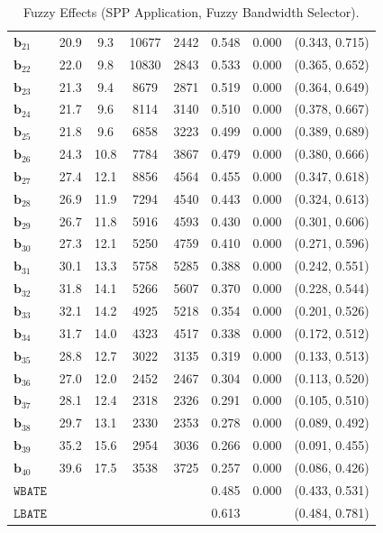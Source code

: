 \documentclass[10pt]{article}
\newcommand{\bb}{\mathbf{b}}
\begin{document}
\begin{table}[p]
\begin{tabular}{lccccccc}
   $\bb_{21}$ & 20.9 & 9.3 & 10677 & 2442 & 0.548 & 0.000 & (0.343, 0.715)\\
   $\bb_{22}$ & 22.0 & 9.8 & 10830 & 2843 & 0.533 & 0.000 & (0.365, 0.652)\\
   $\bb_{23}$ & 21.3 & 9.4 & 8679 & 2871 & 0.519 & 0.000 & (0.364, 0.649)\\
   $\bb_{24}$ & 21.7 & 9.6 & 8114 & 3140 & 0.510 & 0.000 & (0.378, 0.667)\\
   $\bb_{25}$ & 21.8 & 9.6 & 6858 & 3223 & 0.499 & 0.000 & (0.389, 0.689)\\
   $\bb_{26}$ & 24.3 & 10.8 & 7784 & 3867 & 0.479 & 0.000 & (0.380, 0.666)\\
   $\bb_{27}$ & 27.4 & 12.1 & 8856 & 4564 & 0.455 & 0.000 & (0.347, 0.618)\\
   $\bb_{28}$ & 26.9 & 11.9 & 7294 & 4540 & 0.443 & 0.000 & (0.324, 0.613)\\
   $\bb_{29}$ & 26.7 & 11.8 & 5916 & 4593 & 0.430 & 0.000 & (0.301, 0.606)\\
   $\bb_{30}$ & 27.3 & 12.1 & 5250 & 4759 & 0.410 & 0.000 & (0.271, 0.596)\\
   $\bb_{31}$ & 30.1 & 13.3 & 5758 & 5285 & 0.388 & 0.000 & (0.242, 0.551)\\
   $\bb_{32}$ & 31.8 & 14.1 & 5266 & 5607 & 0.370 & 0.000 & (0.228, 0.544)\\
   $\bb_{33}$ & 32.1 & 14.2 & 4925 & 5218 & 0.354 & 0.000 & (0.201, 0.526)\\
   $\bb_{34}$ & 31.7 & 14.0 & 4323 & 4517 & 0.338 & 0.000 & (0.172, 0.512)\\
   $\bb_{35}$ & 28.8 & 12.7 & 3022 & 3135 & 0.319 & 0.000 & (0.133, 0.513)\\
   $\bb_{36}$ & 27.0 & 12.0 & 2452 & 2467 & 0.304 & 0.000 & (0.113, 0.520)\\
   $\bb_{37}$ & 28.1 & 12.4 & 2318 & 2326 & 0.291 & 0.000 & (0.105, 0.510)\\
   $\bb_{38}$ & 29.7 & 13.1 & 2330 & 2353 & 0.278 & 0.000 & (0.089, 0.492)\\
   $\bb_{39}$ & 35.2 & 15.6 & 2954 & 3036 & 0.266 & 0.000 & (0.091, 0.455)\\
   $\bb_{40}$ & 39.6 & 17.5 & 3538 & 3725 & 0.257 & 0.000 & (0.086, 0.426)\\
  \midrule
   $\mathtt{WBATE}$ &  &  &  &  & 0.485 & 0.000 & (0.433, 0.531)\\
  \midrule
   $\mathtt{LBATE}$ &  &  &  &  & 0.613 &  & (0.484, 0.781)\\
  \bottomrule\bottomrule
\end{tabular}

    \caption{Fuzzy Effects (SPP Application, Fuzzy Bandwidth Selector).}
    \label{tab:sa-empapp_main_fuzzy_bwmain}
\end{table}
\end{document}

